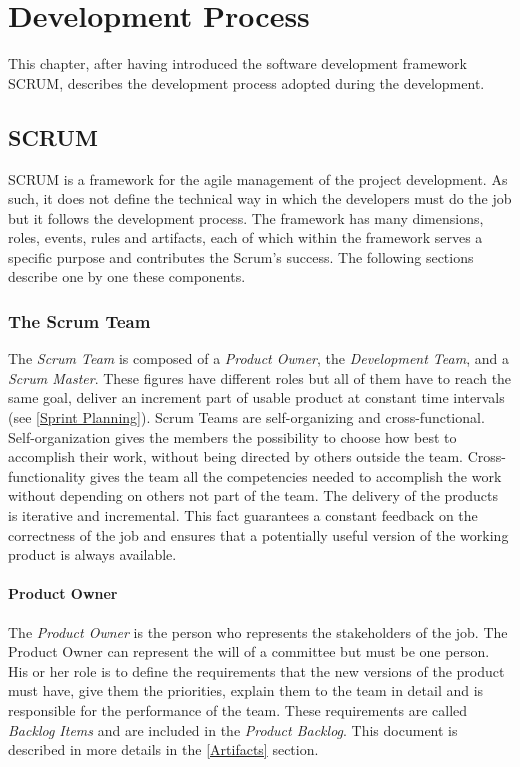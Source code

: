 \chapter{Development Process}
This chapter, after having introduced the software development framework SCRUM, describes the development process adopted during the development.

	\section{SCRUM}
	SCRUM is a framework for the agile management of the project development. 
	As such, it does not define the technical way in which the developers must do the job but it follows the development process. 	
	The framework has many dimensions, roles, events, rules and artifacts, each of which within the framework serves a specific purpose and contributes the Scrum's success. The following sections describe one by one these components.

		\subsection{The Scrum Team}
		The \emph{Scrum Team} is composed of a \emph{Product Owner}, the \emph{Development Team}, and a \emph{Scrum Master}.
		These figures have different roles but all of them have to reach the same goal, deliver an increment part of usable product at constant time intervals (see \ref{Sprint Planning}). Scrum Teams are self-organizing and cross-functional. Self-organization gives the members the possibility to choose how best to accomplish their work, without being directed by others outside the team. Cross-functionality gives the team all the competencies needed to accomplish the work without depending on others not part of the team. The delivery of the products is iterative and incremental. This fact guarantees a constant feedback on the correctness of the job and ensures that a potentially useful version of the working product is always available.
			\subsubsection{Product Owner}
			The \emph{Product Owner} is the person who represents the stakeholders of the job. The Product Owner can represent the will of a committee but must be one person. His or her role is to define the requirements that the new versions of the product must have, give them the priorities, explain them to the team in detail and is responsible for the performance of the team. These requirements are called \emph{Backlog Items} and are included in the \emph{Product Backlog}. This document is described in more details in the \ref{Artifacts} section.

